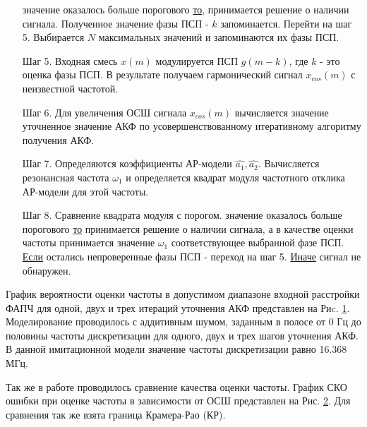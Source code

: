 \begin{itemize}
	  значение оказалось больше порогового {\underline{то}},
		принимается решение о наличии сигнала. Полученное значение фазы ПСП  - ${k}$ запоминается.
		Перейти на шаг 5.
		Выбирается ${N}$ максимальных значений и запоминаются их фазы ПСП.
\item[Шаг 5.] Входная смесь ${x(m)}$ модулируется ПСП ${g(m-k)}$, где ${k}$ - это оценка фазы ПСП. В результате получаем гармонический
	сигнал ${x_{cos}(m)}$ с неизвестной частотой.
\item[Шаг 6.] Для увеличения ОСШ сигнала ${x_{cos}(m)}$ вычисляется значение уточненное значение АКФ
	по усовершенствованному итеративному алгоритму получения АКФ.
\item[Шаг 7.] Определяются коэффициенты АР-модели ${\hat{a_1}, \hat{a_2}}$.
	Вычисляется резонансная частота ${\omega_1}$ и определяется квадрат модуля частотного отклика АР-модели для этой частоты. 
\item[Шаг 8.]
	Сравнение квадрата модуля с порогом.
          значение оказалось больше порогового {\underline{то}} 
                принимается решение о наличии сигнала, а в качестве оценки
                частоты принимается значение ${\omega_1}$ соответствующее выбранной фазе ПСП. 
		\subsubitem\underline{Если} остались непроверенные фазы ПСП - переход на шаг 5.
		\subsubitem\underline{Иначе} сигнал не обнаружен.
\end{itemize}

График вероятности оценки частоты в допустимом диапазоне входной расстройки ФАПЧ для одной, двух и трех итераций уточнения АКФ представлен на Риc.
\ref{pic:ar_dma_probability}. Моделирование проводилось с аддитивным шумом, заданным в полосе от 0 Гц до
половины частоты дискретизации для одного, двух и трех шагов уточнения АКФ. В данной имитационной модели значение частоты дискретизации равно 16.368 МГц.
\begin{figure}[h]
\center{}
	\caption{ }
	\label{pic:ar_dma_probability}
\end{figure}

Так же в работе проводилось сравнение качества оценки частоты. График СКО ошибки при оценке частоты в зависимости
от ОСШ представлен на Рис. \ref{pic:crlb_vs_snr}. Для сравнения так же взята граница Крамера-Рао (КР).
\begin{figure}[h]
\center{}
	\caption{ }
	\label{pic:crlb_vs_snr}
\end{figure}

